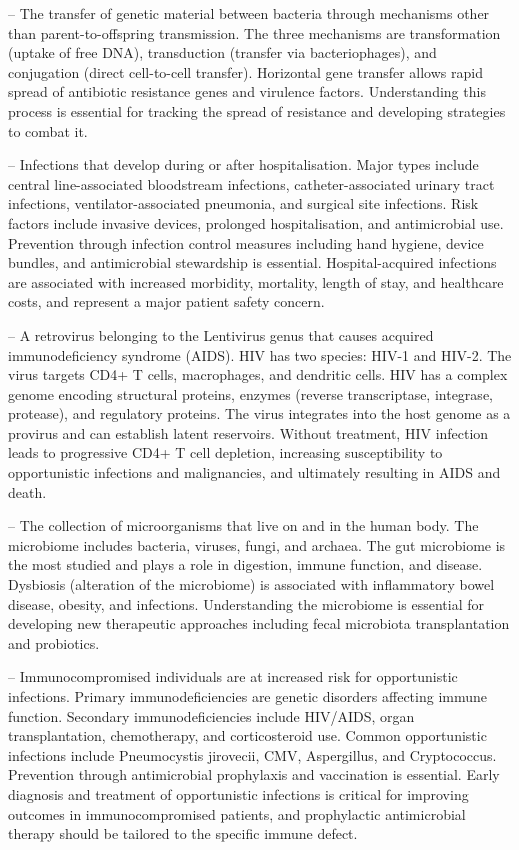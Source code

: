 -- The transfer of genetic material between bacteria through mechanisms other than parent-to-offspring transmission. The three mechanisms are transformation (uptake of free DNA), transduction (transfer via bacteriophages), and conjugation (direct cell-to-cell transfer). Horizontal gene transfer allows rapid spread of antibiotic resistance genes and virulence factors. Understanding this process is essential for tracking the spread of resistance and developing strategies to combat it.

-- Infections that develop during or after hospitalisation. Major types include central line-associated bloodstream infections, catheter-associated urinary tract infections, ventilator-associated pneumonia, and surgical site infections. Risk factors include invasive devices, prolonged hospitalisation, and antimicrobial use. Prevention through infection control measures including hand hygiene, device bundles, and antimicrobial stewardship is essential. Hospital-acquired infections are associated with increased morbidity, mortality, length of stay, and healthcare costs, and represent a major patient safety concern.

-- A retrovirus belonging to the Lentivirus genus that causes acquired immunodeficiency syndrome (AIDS). HIV has two species: HIV-1 and HIV-2. The virus targets CD4+ T cells, macrophages, and dendritic cells. HIV has a complex genome encoding structural proteins, enzymes (reverse transcriptase, integrase, protease), and regulatory proteins. The virus integrates into the host genome as a provirus and can establish latent reservoirs. Without treatment, HIV infection leads to progressive CD4+ T cell depletion, increasing susceptibility to opportunistic infections and malignancies, and ultimately resulting in AIDS and death.

-- The collection of microorganisms that live on and in the human body. The microbiome includes bacteria, viruses, fungi, and archaea. The gut microbiome is the most studied and plays a role in digestion, immune function, and disease. Dysbiosis (alteration of the microbiome) is associated with inflammatory bowel disease, obesity, and infections. Understanding the microbiome is essential for developing new therapeutic approaches including fecal microbiota transplantation and probiotics.

-- Immunocompromised individuals are at increased risk for opportunistic infections. Primary immunodeficiencies are genetic disorders affecting immune function. Secondary immunodeficiencies include HIV/AIDS, organ transplantation, chemotherapy, and corticosteroid use. Common opportunistic infections include Pneumocystis jirovecii, CMV, Aspergillus, and Cryptococcus. Prevention through antimicrobial prophylaxis and vaccination is essential. Early diagnosis and treatment of opportunistic infections is critical for improving outcomes in immunocompromised patients, and prophylactic antimicrobial therapy should be tailored to the specific immune defect.

